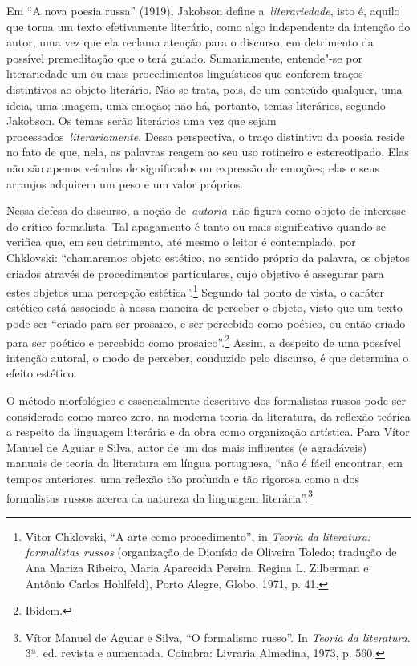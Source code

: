 Em ``A nova poesia russa'' (1919), Jakobson define
a~\emph{literariedade}, isto é, aquilo que torna um texto efetivamente
literário, como algo independente da intenção do autor, uma vez que ela
reclama atenção para o discurso, em detrimento da possível premeditação
que o terá guiado. Sumariamente, entende"-se por literariedade um ou mais
procedimentos linguísticos que conferem traços distintivos ao objeto
literário. Não se trata, pois, de um conteúdo qualquer, uma ideia, uma
imagem, uma emoção; não há, portanto, temas literários, segundo
Jakobson. Os temas serão literários uma vez que sejam
processados\emph{~literariamente}. Dessa perspectiva, o traço distintivo
da poesia reside no fato de que, nela, as palavras reagem ao seu uso
rotineiro e estereotipado. Elas não são apenas veículos de significados
ou expressão de emoções; elas e seus arranjos adquirem um peso e um
valor próprios.

Nessa defesa do discurso, a noção de~\emph{autoria}~não figura como
objeto de interesse do crítico formalista. Tal apagamento é tanto ou
mais significativo quando se verifica que, em seu detrimento, até mesmo
o leitor é contemplado, por Chklovski: ``chamaremos objeto estético, no
sentido próprio da palavra, os objetos criados através de procedimentos
particulares, cujo objetivo é assegurar para estes objetos uma percepção
estética''.\footnote{Vitor Chklovski, ``A arte como procedimento'', in
  \emph{Teoria da literatura: formalistas russos} (organização de
  Dionísio de Oliveira Toledo; tradução de Ana Mariza Ribeiro, Maria
  Aparecida Pereira, Regina L. Zilberman e Antônio Carlos Hohlfeld),
  Porto Alegre, Globo, 1971, p. 41.} Segundo tal ponto de vista, o
caráter estético está associado à nossa maneira de perceber o objeto,
visto que um texto pode ser ``criado para ser prosaico, e ser percebido
como poético, ou então criado para ser poético e percebido como
prosaico''.\footnote{Ibidem.} Assim, a despeito de uma possível intenção
autoral, o modo de perceber, conduzido pelo discurso, é que determina o
efeito estético.

O método morfológico e essencialmente descritivo dos formalistas russos
pode ser considerado como marco zero, na moderna teoria da literatura,
da reflexão teórica a respeito da linguagem literária e da obra como
organização artística. Para Vítor Manuel de Aguiar e Silva, autor de um
dos mais influentes (e agradáveis) manuais de teoria da literatura em
língua portuguesa, ``não é fácil encontrar, em tempos anteriores, uma
reflexão tão profunda e tão rigorosa como a dos formalistas russos
acerca da natureza da linguagem literária''.\footnote{Vítor Manuel de
  Aguiar e Silva, ``O formalismo russo''. In \emph{Teoria da
  literatura}. 3ª. ed. revista e aumentada. Coimbra: Livraria Almedina,
  1973, p. 560.}

